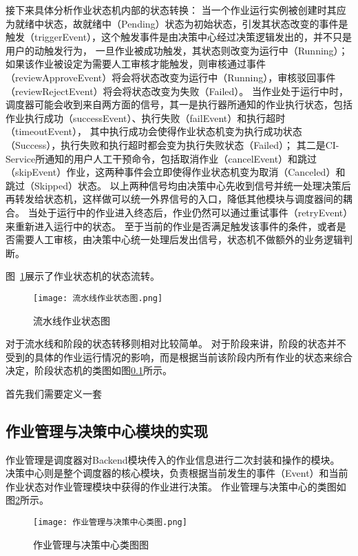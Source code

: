 接下来具体分析作业状态机内部的状态转换：
当一个作业运行实例被创建时其应为就绪中状态，故就绪中（Pending）状态为初始状态，引发其状态改变的事件是触发（triggerEvent），这个触发事件是由决策中心经过决策逻辑发出的，并不只是用户的动触发行为，
一旦作业被成功触发，其状态则改变为运行中（Running）；如果该作业被设定为需要人工审核才能触发，则审核通过事件（reviewApproveEvent）将会将状态改变为运行中（Running），审核驳回事件（reviewRejectEvent）将会将状态改变为失败（Failed）。
当作业处于运行中时，调度器可能会收到来自两方面的信号，其一是执行器所通知的作业执行状态，包括作业执行成功（successEvent）、执行失败（failEvent）和执行超时（timeoutEvent），
其中执行成功会使得作业状态机变为执行成功状态（Success），执行失败和执行超时都会变为执行失败状态（Failed）；
其二是CI-Service所通知的用户人工干预命令，包括取消作业（cancelEvent）和跳过（skipEvent）作业，这两种事件会立即使得作业状态机变为取消（Canceled）和跳过（Skipped）状态。
以上两种信号均由决策中心先收到信号并统一处理决策后再转发给状态机，这样做可以统一外界信号的入口，降低其他模块与调度器间的耦合。
当处于运行中的作业进入终态后，作业仍然可以通过重试事件（retryEvent）来重新进入运行中的状态。
至于当前的作业是否满足触发该事件的条件，或者是否需要人工审核，由决策中心统一处理后发出信号，状态机不做额外的业务逻辑判断。

图~\ref{fig:流水线作业状态图}展示了作业状态机的状态流转。

\begin{figure}[h]
  \centering
  \texttt{[image: 流水线作业状态图.png]}
  \caption{流水线作业状态图}
  \label{fig:流水线作业状态图}
\end{figure}

对于流水线和阶段的状态转移则相对比较简单。
对于阶段来讲，阶段的状态并不受到的具体的作业运行情况的影响，而是根据当前该阶段内所有作业的状态来综合决定，阶段状态机的类图如图\ref{}所示。

首先我们需要定义一套

\subsection{作业管理与决策中心模块的实现}

作业管理是调度器对Backend模块传入的作业信息进行二次封装和操作的模块。
决策中心则是整个调度器的核心模块，负责根据当前发生的事件（Event）和当前作业状态对作业管理模块中获得的作业进行决策。
作业管理与决策中心的类图如图\ref{fig:作业管理与决策中心类图}所示。

\begin{figure}[h]
  \centering
  \texttt{[image: 作业管理与决策中心类图.png]}
  \caption{作业管理与决策中心类图图}
  \label{fig:作业管理与决策中心类图}
\end{figure}

